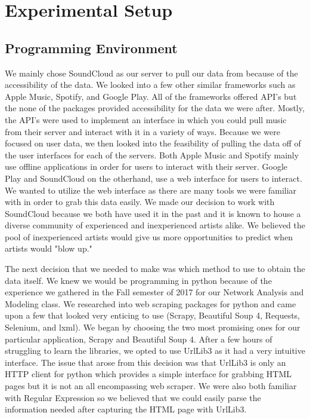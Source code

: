 \documentclass{article}
\begin{document}
\section{Experimental Setup}
\subsection{Programming Environment}
We mainly chose SoundCloud as our server to pull our data from because of the accessibility of the data.  We looked into a few other similar frameworks such as Apple Music, Spotify, and Google Play.  All of the frameworks offered API's but the none of the packages provided accessibility for the data we were after.  Mostly, the API's were used to implement an interface in which you could pull music from their server and interact with it in a variety of ways.  Because we were focused on user data, we then looked into the feasibility of pulling the data off of the user interfaces for each of the servers.  Both Apple Music and Spotify mainly use offline applications in order for users to interact with their server.  Google Play and SoundCloud on the otherhand, use a web interface for users to interact.  We wanted to utilize the web interface as there are many tools we were familiar with in order to grab this data easily.  We made our decision to work with SoundCloud because we both have used it in the past and it is known to house a diverse community of experienced and inexperienced artists alike. We believed the pool of inexperienced artists would give us more opportunities to predict when artists would "blow up." 

The next decision that we needed to make was which method to use to obtain the data itself.  We knew we would be programming in python because of the experience we gathered in the Fall semester of 2017 for our Network Analysis and Modeling class.  We researched into web scraping packages for python and came upon a few that looked very enticing to use (Scrapy, Beautiful Soup 4, Requests, Selenium, and lxml).  We began by choosing the two most promising ones for our particular application, Scrapy and Beautiful Soup 4.  After a few hours of struggling to learn the libraries, we opted to use UrlLib3 as it had a very intuitive interface.  The issue that arose from this decision was that UrlLib3 is only an HTTP client for python which provides a simple interface for grabbing HTML pages but it is not an all encompassing web scraper.  We were also both familiar with Regular Expression so we believed that we could easily parse the information needed after capturing the HTML page with UrlLib3.
\end{document}

